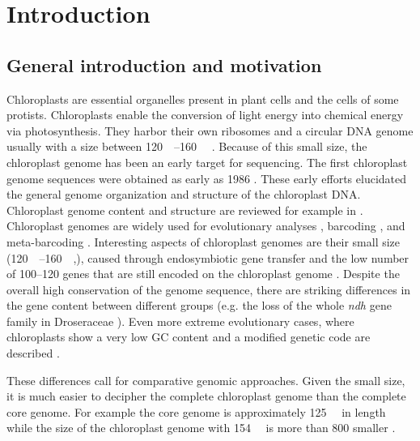 \documentclass{bmcart}
\newcommand{\genename}[1]{\textit{#1}}
\begin{document}

\section*{Introduction}
\subsection*{General introduction and motivation}
Chloroplasts are essential organelles present in plant cells and the cells of some protists.
Chloroplasts enable the conversion of light energy into chemical energy via photosynthesis.
They harbor their own ribosomes and a circular DNA genome usually with a size between \SIrange{120}{160}{\kilo\basepair} \cite{palmer_1985}.
Because of this small size, the chloroplast genome has been an early target for sequencing.
The first chloroplast genome sequences were obtained as early as 1986 \cite{ohyama_chloroplast_1986,shinozaki_complete_1986}.
These early efforts elucidated the general genome organization and structure of the chloroplast DNA. 
Chloroplast genome content and structure are reviewed for example in \cite{wicke_evolution_2011,green_chloroplast_2011}.
Chloroplast genomes are widely used for evolutionary analyses \cite{martin_plastid_2010,xiao-ming_inferring_2017}, barcoding \cite{kress_use_2005,hollingsworth_dna_2009,de_vere_dna_2015}, and meta-barcoding \cite{bell_review_2016,deiner_environmental_2017}.
Interesting aspects of chloroplast genomes are their small size (\SIrange{120}{160}{\kilo\basepair},\cite{palmer_1985}), caused through endosymbiotic gene transfer \cite{martin_evolutionary_2002,timmis_endosymbiotic_2004} and the low number of \numrange{100}{120} genes that are still encoded on the chloroplast genome \cite{wicke_evolution_2011}.
Despite the overall high conservation of the genome sequence, there are striking differences in the gene content between different groups (e.g. the loss of the whole \genename{ndh} gene family in Droseraceae \cite{nevill_plastome-wide_2019}). Even more extreme evolutionary cases, where chloroplasts show a very low GC content and a modified genetic code are described \cite{su_novel_2019}.

These differences call for comparative genomic approaches.
Given the small size, it is much easier to decipher the complete chloroplast genome than the complete core genome.
For example the  core genome is approximately \SI{125}{\mega\basepair} in length \cite{schmuths2004,cao2011} while the size of the  chloroplast genome with \SI{154}{\kilo\basepair} is more than \SI{800}{\times} smaller \cite{sato1999}.
\end{document}
